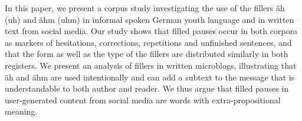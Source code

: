 In this paper, we present a corpus study investigating the use of the fillers äh (uh) and ähm (uhm) in informal spoken German youth language and in written text from social media. Our study shows that filled pauses occur in both corpora as markers of hesitations, corrections, repetitions and unfinished sentences, and that the form as well as the type of the fillers are distributed similarly in both registers. We present an analysis of fillers in written microblogs, illustrating that äh and ähm are used intentionally and can add a subtext to the message that is understandable to both author and reader. We thus argue that filled pauses in user-generated content from social media are words with extra-propositional meaning.
